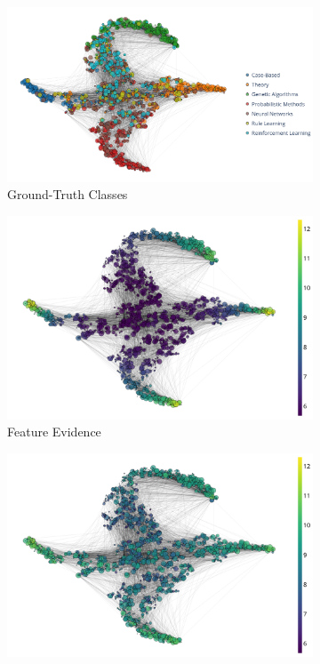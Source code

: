 \begin{figure}[!h]
    \centering
	\begin{subfigure}[t]{\textwidth}
	    \centering
		\includegraphics[height=0.25\textheight]{resources/loc-classes.png}
		\caption{Ground-Truth Classes} 
		\label{subfig:loc-clean-classes}
	\end{subfigure}
	\begin{subfigure}[t]{\textwidth}
	    \centering
		\includegraphics[height=0.25\textheight]{resources/loc-ft-evidence.png}
		\caption{Feature Evidence} 
		\label{subfig:loc-clean-feature-evidence}
	\end{subfigure}
	\begin{subfigure}[t]{\textwidth}
	    \centering
		\includegraphics[height=0.25\textheight]{resources/loc-evidence.png}

\end{subfigure}
\end{figure}
